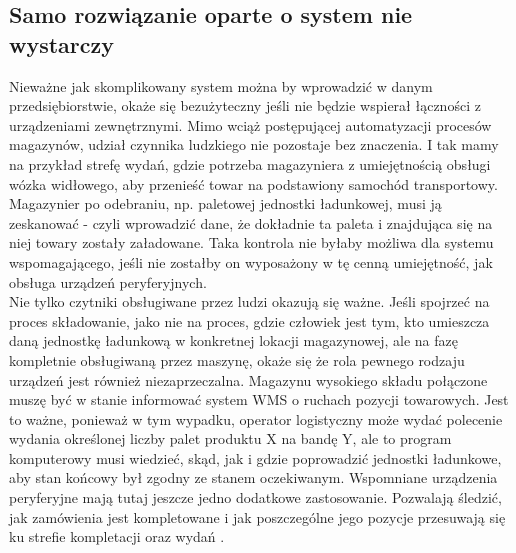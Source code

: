 	\subsection{Samo rozwiązanie oparte o system nie wystarczy}
	Nieważne jak skomplikowany system można by wprowadzić w danym przedsiębiorstwie, okaże się
	bezużyteczny jeśli nie będzie wspierał łączności z urządzeniami zewnętrznymi. Mimo wciąż 
	postępującej automatyzacji procesów magazynów, udział czynnika ludzkiego nie pozostaje bez 
	znaczenia. I tak mamy na przykład strefę wydań, gdzie potrzeba magazyniera z umiejętnością
	obsługi wózka widłowego, aby przenieść towar na podstawiony samochód transportowy. 
	Magazynier po odebraniu, np. paletowej jednostki ładunkowej, musi ją zeskanować - czyli
	wprowadzić dane, że dokładnie ta paleta i znajdująca się na niej towary zostały załadowane.
	Taka kontrola nie byłaby możliwa dla systemu wspomagającego, jeśli nie zostałby on wyposażony
	w tę cenną umiejętność, jak obsługa urządzeń peryferyjnych. \\
	
	Nie tylko czytniki obsługiwane przez ludzi okazują się ważne. Jeśli spojrzeć na proces składowanie,
	jako nie na proces, gdzie człowiek jest tym, kto umieszcza daną jednostkę ładunkową w konkretnej lokacji
	magazynowej, ale na fazę kompletnie obsługiwaną przez maszynę, okaże się że rola pewnego
	rodzaju urządzeń jest również niezaprzeczalna. Magazynu wysokiego składu połączone muszę być w stanie
	informować system WMS o ruchach pozycji towarowych. Jest to ważne, ponieważ w tym wypadku, operator
	logistyczny może wydać polecenie wydania określonej liczby palet produktu X na bandę Y, ale to program
	komputerowy musi wiedzieć, skąd, jak i gdzie poprowadzić jednostki ładunkowe, aby stan
	końcowy był zgodny ze stanem oczekiwanym. Wspomniane urządzenia peryferyjne mają tutaj jeszcze jedno
	dodatkowe zastosowanie. Pozwalają śledzić, jak zamówienia jest kompletowane i jak poszczególne
	jego pozycje przesuwają się ku strefie kompletacji oraz wydań \cite{LAJ_ZZ_KWMS}.
	

